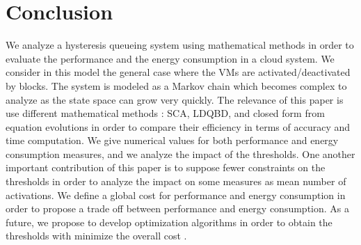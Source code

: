 \documentclass[conference]{IEEEtran}
\begin{document}
% 
% 

\section{Conclusion}
We analyze a hysteresis queueing system using mathematical methods in order to evaluate the performance 
and the energy consumption in a cloud system. We consider in this model the general case where the VMs are activated/deactivated by blocks. 
The system is modeled as a Markov chain which becomes complex to analyze as the state space can grow very 
quickly.  The relevance of this paper is  use different mathematical methods : SCA, LDQBD, and closed form from equation evolutions in order 
to compare their efficiency in terms of accuracy and time computation. We give numerical values for both performance and energy consumption measures, and we analyze the impact of the thresholds.  One another important contribution of this paper  is to suppose fewer constraints on the thresholds in order to analyze the impact on some measures as mean number of activations. 
We define a 
global cost for performance and energy consumption in order to propose  a trade off between performance and energy consumption. 
As a future,  we propose to develop optimization algorithms in order to obtain the thresholds with minimize 
the overall cost . 
\end{document}
